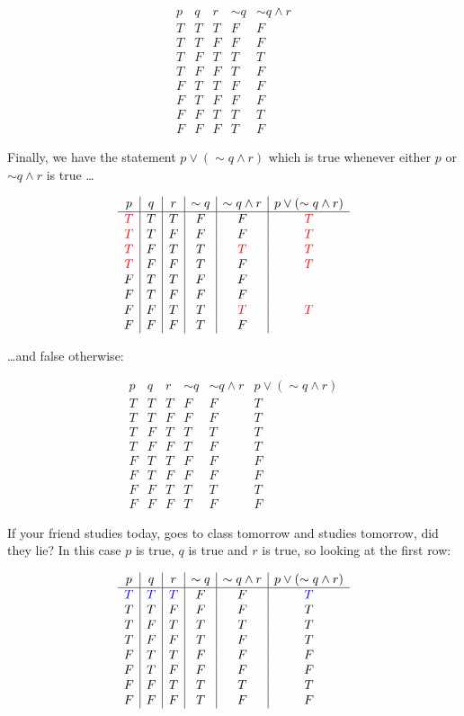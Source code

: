 \documentclass[10pt]{article}
\theoremstyle{definition}
\begin{document}
 $$\begin{array}{c|c|c|c|c}
p&q&r&\sim q & \sim q \wedge r\\
\hline
T & T&T&F&F\\
T&T&F&F&F \\
T&F&T&T&T\\
T&F&F&T&F\\
F & T&T&F&F\\
F&T&F&F&F\\
F&F&T&T&T\\
F&F&F&T&F
\end{array}$$

Finally, we have the statement $p\vee (\sim q \wedge r)$ which is true whenever either $p$ or $\sim q \wedge r$ is true \ldots


 $$\begin{array}{c|c|c|c|c|c}
p&q&r&\sim q & \sim q \wedge r& p\vee(\sim q \wedge r)\\
\hline
\textcolor{red}{T} & T&T&F&F&\textcolor{red}{T}\\
\textcolor{red}{T}&T&F&F&F&\textcolor{red}{T} \\
\textcolor{red}{T}&F&T&T&\textcolor{red}{T}&\textcolor{red}{T}\\
\textcolor{red}{T}&F&F&T&F&\textcolor{red}{T}\\
F & T&T&F&F\\
F&T&F&F&F\\
F&F&T&T&\textcolor{red}{T}&\textcolor{red}{T}\\
F&F&F&T&F
\end{array}$$

\ldots and false otherwise:


 $$\begin{array}{c|c|c|c|c|c}
p&q&r&\sim q & \sim q \wedge r& p\vee (\sim q \wedge r)\\
\hline
T & T&T&F&F&T\\
T&T&F&F&F&T \\
T&F&T&T&T&T\\
T&F&F&T&F&T\\
F & T&T&F&F&F\\
F&T&F&F&F&F\\
F&F&T&T&T&T\\
F&F&F&T&F&F
\end{array}$$

If your friend studies today, goes to class tomorrow and studies tomorrow, did they lie?  In this case $p$ is true, $q$ is true and $r$ is true, so looking at the first row:

 $$\begin{array}{c|c|c|c|c|c}
p&q&r&\sim q & \sim q \wedge r& p\vee (\sim q \wedge r)\\
\hline
\textcolor{blue}{T} & \textcolor{blue}T&\textcolor{blue}T&F&F&\textcolor{blue}T\\
T&T&F&F&F&T \\
T&F&T&T&T&T\\
T&F&F&T&F&T\\
F & T&T&F&F&F\\
F&T&F&F&F&F\\
F&F&T&T&T&T\\
F&F&F&T&F&F
\end{array}$$
\end{document}
